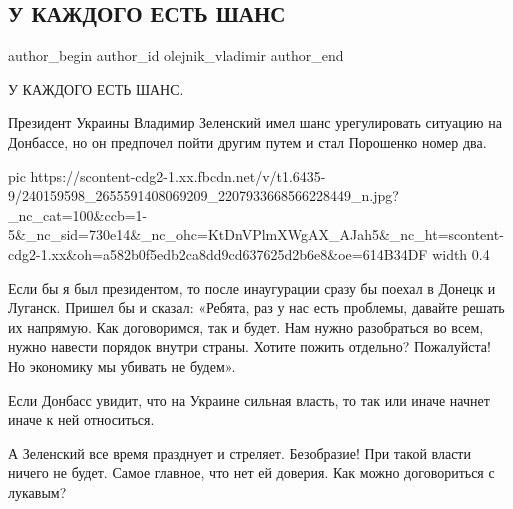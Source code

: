  
 
 
 
 
 
\subsection{У КАЖДОГО ЕСТЬ ШАНС}
\label{sec:25_08_2021.fb.olejnik_vladimir.4.u_kazhdogo_est_shans}
 
\ifcmt
 author_begin
   author_id olejnik_vladimir
 author_end
\fi

У КАЖДОГО ЕСТЬ ШАНС.

Президент Украины Владимир Зеленский имел шанс урегулировать ситуацию на
Донбассе, но он предпочел пойти другим путем и стал Порошенко номер два.

\ifcmt
  pic https://scontent-cdg2-1.xx.fbcdn.net/v/t1.6435-9/240159598_2655591408069209_2207933668566228449_n.jpg?_nc_cat=100&ccb=1-5&_nc_sid=730e14&_nc_ohc=KtDnVPlmXWgAX_AJah5&_nc_ht=scontent-cdg2-1.xx&oh=a582b0f5edb2ca8dd9cd637625d2b6e8&oe=614B34DF
  width 0.4
\fi

Если бы я был президентом, то после инаугурации сразу бы поехал в  Донецк и
Луганск. Пришел бы и сказал: «Ребята, раз у нас есть проблемы, давайте решать
их напрямую. Как договоримся, так и будет. Нам нужно разобраться во всем, нужно
навести порядок внутри страны. Хотите пожить отдельно? Пожалуйста! Но экономику
мы убивать не будем».

Если Донбасс  увидит, что на Украине сильная власть, то так или иначе начнет
иначе к ней относиться.

А Зеленский все время празднует и стреляет. Безобразие! При такой власти ничего
не будет. Самое главное, что нет ей доверия. Как можно договориться с лукавым?


